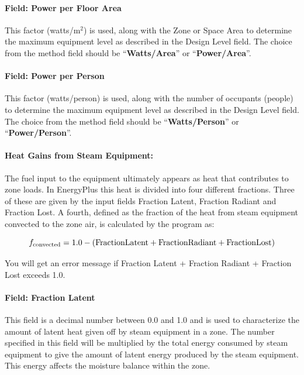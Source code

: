 \paragraph{Field: Power per Floor Area}\label{field-power-per-zone-floor-area-2-steam-definition}

This factor (watts/m\(^{2}\)) is used, along with the Zone or Space Area to determine the maximum equipment level as described in the Design Level field. The choice from the method field should be ``\textbf{Watts/Area}'' or ``\textbf{Power/Area}''.

\paragraph{Field: Power per Person}\label{field-power-per-person-2-steam-definition}

This factor (watts/person) is used, along with the number of occupants (people) to determine the maximum equipment level as described in the Design Level field. The choice from the method field should be ``\textbf{Watts/Person}'' or ``\textbf{Power/Person}''.

\paragraph{Heat Gains from Steam Equipment:}\label{heat-gains-from-steam-equipment-steam-definition}

The fuel input to the equipment ultimately appears as heat that contributes to zone loads. In EnergyPlus this heat is divided into four different fractions. Three of these are given by the input fields Fraction Latent, Fraction Radiant and Fraction Lost. A fourth, defined as the fraction of the heat from steam equipment convected to the zone air, is calculated by the program as:

\begin{equation}
  f_{\rm{convected}} = 1.0 - (\rm{Fraction Latent} + \rm{Fraction Radiant} + \rm{Fraction Lost})
\end{equation}

You will get an error message if Fraction Latent + Fraction Radiant + Fraction Lost exceeds 1.0.

\paragraph{Field: Fraction Latent}\label{field-fraction-latent-3-steam-definition}

This field is a decimal number between 0.0 and 1.0 and is used to characterize the amount of latent heat given off by steam equipment in a zone. The number specified in this field will be multiplied by the total energy consumed by steam equipment to give the amount of latent energy produced by the steam equipment. This energy affects the moisture balance within the zone.

